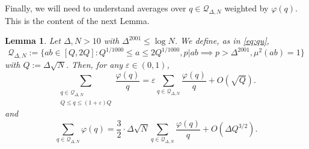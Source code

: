 \documentclass[12pt,reqno]{amsart}
\theoremstyle{plain}
\newtheorem{lemma}{Lemma}
\numberwithin{equation}{section}
\numberwithin{figure}{section}
\theoremstyle{plain}
\theoremstyle{definition}
\theoremstyle{remark}
\begin{document}
Finally, we will need to understand averages over $q \in \mathcal{Q}_{\Delta, N}$ weighted by $\varphi(q)$. This is the content of the next Lemma. 
\begin{lemma} \label{le:comput} 
  Let $\Delta, N > 10$ with $\Delta^{2001} \leq \log N$. We
  define, as in \eqref{eq:qu}, 
  $$
  \mathcal{Q}_{\Delta, N} := \Big \{ a b \in [Q, 2Q]: Q^{1/1000} \leq a \leq 2 Q^{1/1000}, p | a b \implies p > \Delta^{2001}, \mu^2(a b) = 1 \Big \}
  $$
  with $Q := \Delta \sqrt{N}$. Then, for any $\varepsilon \in (0, 1)$, 
$$
\sum_{\substack{q \in \mathcal{Q}_{\Delta, N} \\ Q \leq q \leq (1 + \varepsilon) Q}} \frac{\varphi(q)}{q} = \varepsilon \sum_{q \in \mathcal{Q}_{\Delta, N}} \frac{\varphi(q)}{q} + O(\sqrt{Q}). 
$$
and 
$$
\sum_{q \in \mathcal{Q}_{\Delta, N}} \varphi(q) = \frac{3}{2} \cdot \Delta \sqrt{N} \sum_{q \in \mathcal{Q}_{\Delta, N}} \frac{\varphi(q)}{q}  + O(\Delta Q^{3/2}).
$$
\end{lemma} 
\end{document}
